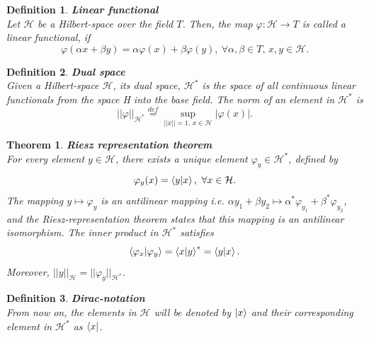 \documentclass[12pt, a4paper,  nobibnotes]{article}
\newtheorem{theorem}{Theorem}
\newtheorem{definition}{Definition}
\begin{document}
\begin{definition}
    \textbf{Linear functional}\\
    Let $\mathcal H$ be a Hilbert-space over the field $T$. Then, the map $\varphi:\mathcal H \rightarrow T$ is  
    called a linear functional, if
    \begin{equation*}
        \varphi(\alpha x + \beta y) = \alpha \varphi(x) + \beta \varphi(y),~
        \forall \alpha, \beta \in T,\, x, y \in \mathcal H.
    \end{equation*}
\end{definition}

\begin{definition}
    \textbf{Dual space}\\
    Given a Hilbert-space $\mathcal H$, its dual space, $\mathcal H^*$ is the space of all continuous linear
    functionals from the space H into the base field.
    The norm of an element in $\mathcal H^*$ is 
    \begin{equation*}
        ||\varphi||_{\mathcal H^*} \overset{def}{=} \underset{||x||=1,\, x \in \mathcal H}{\sup} |\varphi(x)|.
    \end{equation*}
\end{definition}

\begin{theorem}
    \textbf{Riesz representation theorem}\\
    For every element $y \in \mathcal H$, there exists a unique element $\varphi_{y} \in \mathcal H^*$, defined by
    \begin{equation*}
        \varphi_{y}(x) = \braket{y| x},~\forall x \in \mathcal H.
    \end{equation*}
    The mapping $y \mapsto \varphi_{y}$ is an antilinear mapping i.e. $\alpha y_1 + \beta y_2 
    \mapsto \alpha^* \varphi_{y_1} + \beta^* \varphi_{y_2}$, and the Riesz-representation theorem states 
    that this mapping is an antilinear isomorphism. The inner product in $\mathcal H^*$ satisfies 
    \begin{equation*}
        \braket{\varphi_{x}|\varphi_{y}} = \braket{x|y}^* = \braket{y | x}.
    \end{equation*}
    Moreover, $||y||_{\mathcal H} = ||\varphi_{y}||_{\mathcal H^*}$.
\end{theorem}

\begin{definition}
    \textbf{Dirac-notation}\\
    From now on, the elements in $\mathcal H$ will be denoted by $\ket x$ and their corresponding
    element in $\mathcal H^*$ as $\bra x$.
\end{definition}
\end{document}
